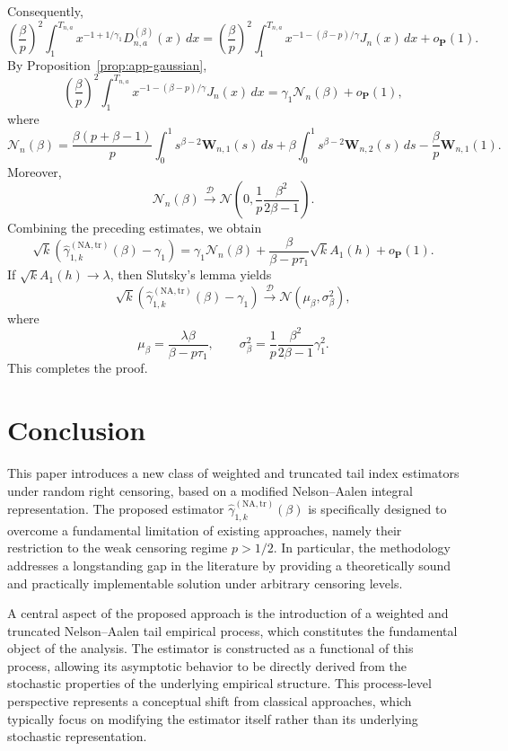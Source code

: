 \documentclass[reqno,openbib,runningheads,a4paper,12pt]{amsart}%
\begin{document}
\noindent Consequently,
\[
\left(  \frac{\beta}{p}\right)  ^{2}\int_{1}^{T_{n,a}}x^{-1+1/\gamma_{1}%
}D_{n,a}^{(\beta)}(x)\,dx=\left(  \frac{\beta}{p}\right)  ^{2}\int%
_{1}^{T_{n,a}}x^{-1-(\beta-p)/\gamma}J_{n}(x)\,dx+o_{\mathbf{P}}(1).
\]
By Proposition~\ref{prop:app-gaussian},
\[
\left(  \frac{\beta}{p}\right)  ^{2}\int_{1}^{T_{n,a}}x^{-1-(\beta-p)/\gamma
}J_{n}(x)\,dx=\gamma_{1}\mathcal{N}_{n}(\beta)+o_{\mathbf{P}}(1),
\]
where
\[
\mathcal{N}_{n}(\beta)=\frac{\beta(p+\beta-1)}{p}\int_{0}^{1}s^{\beta
-2}\mathbf{W}_{n,1}(s)\,ds+\beta\int_{0}^{1}s^{\beta-2}\mathbf{W}%
_{n,2}(s)\,ds-\frac{\beta}{p}\mathbf{W}_{n,1}(1).
\]
Moreover,
\[
\mathcal{N}_{n}(\beta)\overset{\mathcal{D}}{\longrightarrow}\mathcal{N}\left(
0,\frac{1}{p}\frac{\beta^{2}}{2\beta-1}\right)  .
\]
Combining the preceding estimates, we obtain
\[
\sqrt{k}\left(  \widehat{\gamma}_{1,k}^{(\mathrm{NA,tr})}(\beta)-\gamma
_{1}\right)  =\gamma_{1}\mathcal{N}_{n}(\beta)+\frac{\beta}{\beta-p\tau_{1}%
}\sqrt{k}A_{1}(h)+o_{\mathbf{P}}(1).
\]
If $\sqrt{k}A_{1}(h)\rightarrow\lambda$, then Slutsky's lemma yields
\[
\sqrt{k}\left(  \widehat{\gamma}_{1,k}^{(\mathrm{NA,tr})}(\beta)-\gamma
_{1}\right)  \overset{\mathcal{D}}{\longrightarrow}\mathcal{N}\left(
\mu_{\beta},\sigma_{\beta}^{2}\right)  ,
\]
where
\[
\mu_{\beta}=\frac{\lambda\beta}{\beta-p\tau_{1}},\qquad\sigma_{\beta}%
^{2}=\frac{1}{p}\frac{\beta^{2}}{2\beta-1}\gamma_{1}^{2}.
\]
This completes the proof.

\section{\textbf{Conclusion}\label{sec6}}

\noindent This paper introduces a new class of weighted and truncated tail
index estimators under random right censoring, based on a modified
Nelson--Aalen integral representation. The proposed estimator $\widehat{\gamma
}_{1,k}^{(\mathrm{NA,tr})}(\beta)$ is specifically designed to overcome a
fundamental limitation of existing approaches, namely their restriction to the
weak censoring regime $p>1/2$. In particular, the methodology addresses a
longstanding gap in the literature by providing a theoretically sound and
practically implementable solution under arbitrary censoring levels.
\smallskip

\noindent A central aspect of the proposed approach is the introduction of a
weighted and truncated Nelson--Aalen tail empirical process, which constitutes
the fundamental object of the analysis. The estimator is constructed as a
functional of this process, allowing its asymptotic behavior to be directly
derived from the stochastic properties of the underlying empirical structure.
This process-level perspective represents a conceptual shift from classical
approaches, which typically focus on modifying the estimator itself rather
than its underlying stochastic representation. \smallskip
\end{document}
